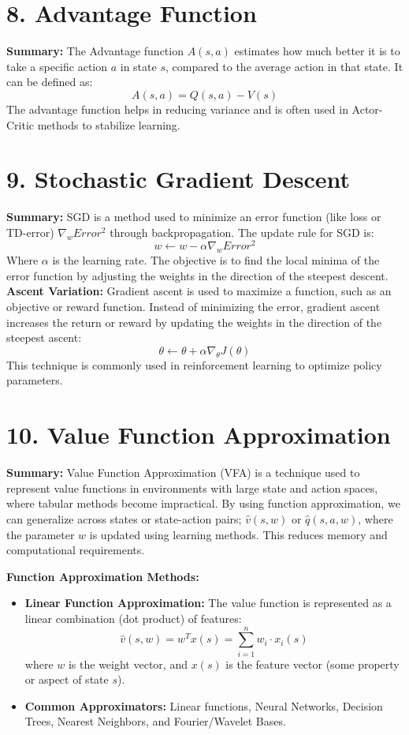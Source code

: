 \documentclass[a4paper,10pt]{article}
\begin{document}
\begin{multicols}{2}
\section*{8. Advantage Function}
\textbf{Summary:} The Advantage function \( A(s, a) \) estimates how much better it is to take a specific action \( a \) in state \( s \), compared to the average action in that state. It can be defined as:
\[
A(s, a) = Q(s, a) - V(s)
\]
The advantage function helps in reducing variance and is often used in Actor-Critic methods to stabilize learning.

\section*{9. Stochastic Gradient Descent}
\textbf{Summary:} SGD is a method used to minimize an error function (like loss or TD-error) \( \nabla_w Error^2 \) through backpropagation. The update rule for SGD is:
\[
w \leftarrow w - \alpha \nabla_w Error^2
\]
Where \( \alpha \) is the learning rate. The objective is to find the local minima of the error function by adjusting the weights in the direction of the steepest descent.
\textbf{Ascent Variation:} Gradient ascent is used to maximize a function, such as an objective or reward function. Instead of minimizing the error, gradient ascent increases the return or reward by updating the weights in the direction of the steepest ascent:
\[
\theta \leftarrow \theta + \alpha \nabla_\theta J(\theta)
\]
This technique is commonly used in reinforcement learning to optimize policy parameters.

\section*{10. Value Function Approximation}
\textbf{Summary:} Value Function Approximation (VFA) is a technique used to represent value functions in environments with large state and action spaces, where tabular methods become impractical. By using function approximation, we can generalize across states or state-action pairs; \( \hat{v}(s,w) \) or \( \hat{q}(s,a,w) \), where the parameter \(w \) is updated using learning methods. This reduces memory and computational requirements.

\noindent \textbf{Function Approximation Methods:}
\begin{itemize}
    \item \textbf{Linear Function Approximation:} The value function is represented as a linear combination (dot product) of features:
    \[
    \hat{v}(s, w) = w^T x(s) = \sum_{i=1}^{n} w_i \cdot x_i(s)
    \]
    where \(w\) is the weight vector, and \(x(s)\) is the feature vector (some property or aspect of state \( s \)).
    \item \textbf{Common Approximators:} Linear functions, Neural Networks, Decision Trees, Nearest Neighbors, and Fourier/Wavelet Bases.
\end{itemize}


\end{multicols}
\end{document}
